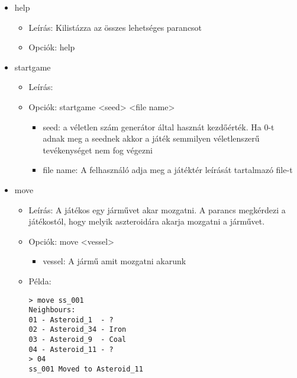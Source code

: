 \documentclass[../../projlab]{subfiles}
\begin{document}
\begin{itemize}
    \item help
    \begin{itemize}
        \item Leírás: Kilistázza az összes lehetséges parancsot
        \item Opciók: help
    \end{itemize}


    \item startgame
    \begin{itemize}
        \item Leírás: 
        \item Opciók: startgame <seed> <file name>
        \begin{itemize}
            \item seed: a véletlen szám generátor által hasznát kezdőérték. \newline
Ha 0-t adnak meg a seednek akkor a játék semmilyen véletlenszerű tevékenységet nem fog végezni
            \item file name: A felhasználó adja meg a játéktér leírását tartalmazó file-t
        \end{itemize}
    \end{itemize}

    \item move
    \begin{itemize}
        \item Leírás: A játékos egy járművet akar mozgatni. \newline
            A parancs megkérdezi a játékostól, hogy melyik aszteroidára akarja mozgatni a járművet.
        \item Opciók: move <vessel>
        \begin{itemize}
            \item vessel: A jármű amit mozgatni akarunk
        \end{itemize}
        \item Példa:
            \begin{verbatim}
> move ss_001
Neighbours:
01 - Asteroid_1  - ?
02 - Asteroid_34 - Iron
03 - Asteroid_9  - Coal
04 - Asteroid_11 - ?
> 04
ss_001 Moved to Asteroid_11
            \end{verbatim}
    \end{itemize}



\end{itemize}
\end{document}
